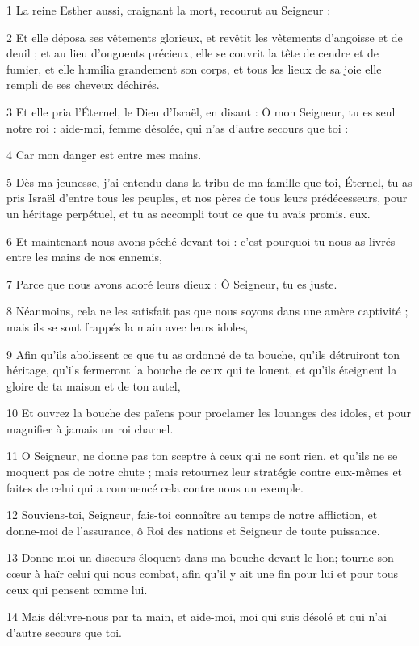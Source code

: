 \par 1 La reine Esther aussi, craignant la mort, recourut au Seigneur :
\par 2 Et elle déposa ses vêtements glorieux, et revêtit les vêtements d'angoisse et de deuil ; et au lieu d'onguents précieux, elle se couvrit la tête de cendre et de fumier, et elle humilia grandement son corps, et tous les lieux de sa joie elle rempli de ses cheveux déchirés.
\par 3 Et elle pria l'Éternel, le Dieu d'Israël, en disant : Ô mon Seigneur, tu es seul notre roi : aide-moi, femme désolée, qui n'as d'autre secours que toi :
\par 4 Car mon danger est entre mes mains.
\par 5 Dès ma jeunesse, j'ai entendu dans la tribu de ma famille que toi, Éternel, tu as pris Israël d'entre tous les peuples, et nos pères de tous leurs prédécesseurs, pour un héritage perpétuel, et tu as accompli tout ce que tu avais promis. eux.
\par 6 Et maintenant nous avons péché devant toi : c'est pourquoi tu nous as livrés entre les mains de nos ennemis,
\par 7 Parce que nous avons adoré leurs dieux : Ô Seigneur, tu es juste.
\par 8 Néanmoins, cela ne les satisfait pas que nous soyons dans une amère captivité ; mais ils se sont frappés la main avec leurs idoles,
\par 9 Afin qu'ils abolissent ce que tu as ordonné de ta bouche, qu'ils détruiront ton héritage, qu'ils fermeront la bouche de ceux qui te louent, et qu'ils éteignent la gloire de ta maison et de ton autel,
\par 10 Et ouvrez la bouche des païens pour proclamer les louanges des idoles, et pour magnifier à jamais un roi charnel.
\par 11 O Seigneur, ne donne pas ton sceptre à ceux qui ne sont rien, et qu'ils ne se moquent pas de notre chute ; mais retournez leur stratégie contre eux-mêmes et faites de celui qui a commencé cela contre nous un exemple.
\par 12 Souviens-toi, Seigneur, fais-toi connaître au temps de notre affliction, et donne-moi de l'assurance, ô Roi des nations et Seigneur de toute puissance.
\par 13 Donne-moi un discours éloquent dans ma bouche devant le lion; tourne son cœur à haïr celui qui nous combat, afin qu'il y ait une fin pour lui et pour tous ceux qui pensent comme lui.
\par 14 Mais délivre-nous par ta main, et aide-moi, moi qui suis désolé et qui n'ai d'autre secours que toi.
